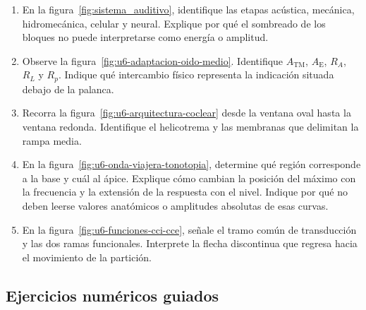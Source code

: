 \begin{enumerate}[label=\textbf{I\arabic*.},leftmargin=*]
    \item En la figura~\ref{fig:sistema_auditivo}, identifique las etapas
    acústica, mecánica, hidromecánica, celular y neural. Explique por qué el
    sombreado de los bloques no puede interpretarse como energía o amplitud.

    \item Observe la figura~\ref{fig:u6-adaptacion-oido-medio}. Identifique
    \(A_\mathrm{TM}\), \(A_\mathrm{E}\), \(R_A\), \(R_L\) y \(R_p\). Indique
    qué intercambio físico representa la indicación situada debajo de la
    palanca.

    \item Recorra la figura~\ref{fig:u6-arquitectura-coclear} desde la ventana
    oval hasta la ventana redonda. Identifique el helicotrema y las membranas
    que delimitan la rampa media.

    \item En la figura~\ref{fig:u6-onda-viajera-tonotopia}, determine qué
    región corresponde a la base y cuál al ápice. Explique cómo cambian la
    posición del máximo con la frecuencia y la extensión de la respuesta con
    el nivel. Indique por qué no deben leerse valores anatómicos o amplitudes
    absolutas de esas curvas.

    \item En la figura~\ref{fig:u6-funciones-cci-cce}, señale el tramo común de
    transducción y las dos ramas funcionales. Interprete la flecha discontinua
    que regresa hacia el movimiento de la partición.
\end{enumerate}

\subsection*{Ejercicios numéricos guiados}

